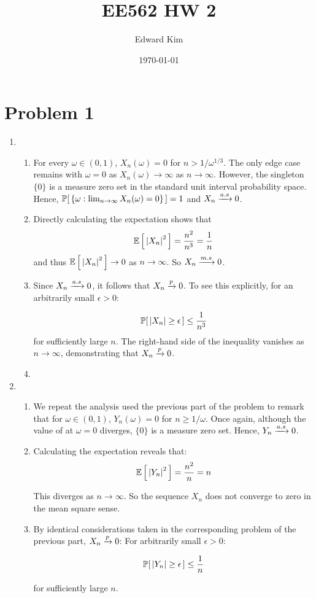 \documentclass[12pt]{article}%
\title{EE562 HW 2}
\author{Edward Kim}
\date{\today}
\begin{document}
\maketitle
\section{Problem 1}

\begin{enumerate}
  \item
  \begin{enumerate}
    \item For every $\omega \in (0,1)$, $X_n(\omega) = 0$ for $n > 1/\omega^{1/3}$. The only edge case remains with $\omega = 0$ as $X_n(\omega) \rightarrow \infty$ as $n \rightarrow \infty$. However, the singleton $\{0\}$ is a measure zero set in the standard unit interval probability space. Hence, $\mathbb{P}[\,\{\omega : \lim_{n \rightarrow \infty} X_n(\omega) = 0\}\,] = 1$ and $X_n \xrightarrow[]{a.s} 0$.

    \item Directly calculating the expectation shows that
    \[\mathbb{E}\left[\,\abs{X_n}^2\,\right] = \frac{n^2}{n^3} = \frac{1}{n}\]
    and thus $\mathbb{E}\left[\,\abs{X_n}^2\,\right] \rightarrow 0$ as $n \rightarrow \infty$. So $X_n \xrightarrow[]{m.s} 0$.

    \item Since $X_n \xrightarrow[]{a.s} 0$, it follows that $X_n \xrightarrow[]{p} 0$. To see this explicitly, for an arbitrarily small $\epsilon > 0$:

    \[\mathbb{P}[\,\abs{X_n} \geq \epsilon\,] \leq \frac{1}{n^3}
    \]
    for sufficiently large $n$. The right-hand side of the inequality vanishes as $n \rightarrow \infty$, demonstrating that $X_n \xrightarrow[]{p} 0$.

    \item

  \end{enumerate}

  \item
  \begin{enumerate}
    \item We repeat the analysis used the previous part of the problem to remark that for $\omega \in (0,1)$, $Y_n(\omega) = 0$ for $n \geq 1/\omega$. Once again, although the value of at $\omega = 0$ diverges, $\{0\}$ is a measure zero set. Hence, $Y_n \xrightarrow[]{a.s} 0$.

    \item Calculating the expectation reveals that:
    \[\mathbb{E}\left[\,\abs{Y_n}^2\,\right] = \frac{n^2}{n} = n \]

    This diverges as $n \rightarrow \infty$. So the sequence $X_n$ does not converge to zero in the mean square sense.

    \item By identical considerations taken in the corresponding problem of the previous part, $X_n \xrightarrow[]{p} 0$: For arbitrarily small $\epsilon >0$:

    \[ \mathbb{P}[\,\abs{Y_n} \geq \epsilon\,] \leq \frac{1}{n} \]

    for sufficiently large $n$.
  \end{enumerate}
\end{enumerate}
\end{document}
